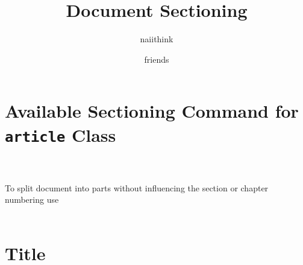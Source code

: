\documentclass{article}
\title{Document Sectioning}
\author{naiithink \and friends}
\begin{document}
\maketitle

\newpage
\tableofcontents

\newpage
\part{Available Sectioning Command for \texttt{article} Class}
\\\\
To split document into parts without influencing the section or chapter numbering use\\\\

\newpage
\part{Title}
\\\\
\end{document}
